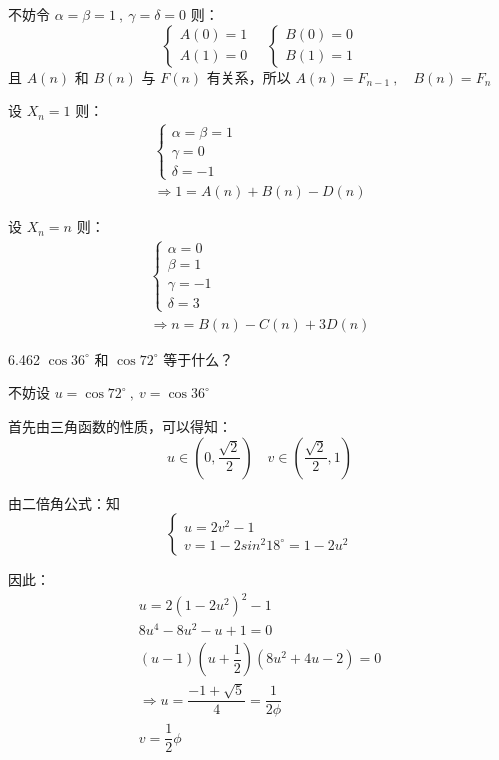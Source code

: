不妨令 \( \alpha = \beta = 1 \ , \ \gamma = \delta = 0 \) 则：
\[
  \begin{cases}
    A(0) = 1 \\
    A(1) = 0
  \end{cases} \quad
  \begin{cases}
    B(0) = 0 \\
    B(1) = 1
  \end{cases}
\]
且 \( A(n) \) 和 \( B(n) \) 与 \( F(n) \) 有关系，所以 \( A(n) = F_{n-1} \ , \quad B(n) = F_n \)

设 \( X_n = 1 \) 则：
\begin{gather*}
  \begin{cases}
    \alpha = \beta = 1 \\
    \gamma = 0 \\
    \delta = -1
  \end{cases} \\
  \Rightarrow 1 = A(n) + B(n) - D(n)
\end{gather*}

设 \( X_n = n \) 则：
\begin{gather*}
  \begin{cases}
    \alpha = 0 \\
    \beta = 1 \\
    \gamma = -1 \\
    \delta = 3
  \end{cases} \\
  \Rightarrow n = B(n) - C(n) + 3 D(n)
\end{gather*}

\begin{problem}{6.46}{2}
  \( \cos{36^\circ} \) 和 \( \cos{72^\circ} \) 等于什么？
\end{problem}

不妨设 \( u = \cos{72^{\circ}} \ , \ v = \cos{36^{\circ}} \)

首先由三角函数的性质，可以得知：
\[
  u \in (0, \dfrac{\sqrt{2}}{2}) \quad v \in (\dfrac{\sqrt{2}}{2}, 1)
\]

由二倍角公式：知
\[
  \begin{cases}
    u = 2 v^2 - 1 \\
    v = 1 - 2 sin^2{18^{\circ}} = 1 - 2 u^2
  \end{cases}
\]

因此：
\begin{gather*}
  u = 2(1 - 2u^2)^2 - 1 \\
  8 u^4 - 8 u^2 - u + 1 = 0 \\
  (u - 1) (u + \dfrac{1}{2}) (8 u^2 + 4u - 2) = 0 \\
  \Rightarrow u = \dfrac{-1 + \sqrt{5}}{4} = \dfrac{1}{2 \phi} \\
  v = \dfrac{1}{2} \phi
\end{gather*}

